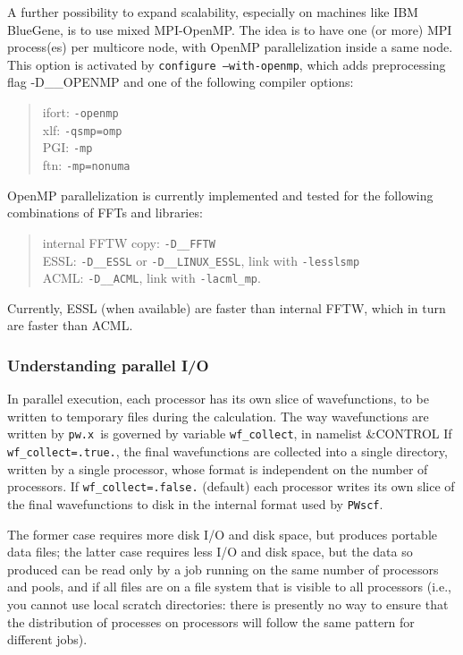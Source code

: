 \documentclass[12pt,a4paper]{article}
\def\pwx{\texttt{pw.x}}
\def\PWscf{\texttt{PWscf}}
\begin{document}
A further possibility to expand scalability, especially on machines
like IBM BlueGene, is to use mixed MPI-OpenMP. The idea is to have
one (or more) MPI process(es) per multicore node, with OpenMP
parallelization inside a same node. This option is activated by  \texttt{configure --with-openmp},
which adds preprocessing flag -D\_\_OPENMP
and one  of the following compiler options:
\begin{quote}
 ifort: \texttt{-openmp}\\
 xlf:   \texttt{-qsmp=omp}\\
 PGI:   \texttt{-mp}\\
 ftn:   \texttt{-mp=nonuma}
\end{quote}
OpenMP parallelization is currently implemented and tested for the following combinations of FFTs
and libraries:
\begin{quote}
 internal FFTW copy: \texttt{-D\_\_FFTW}\\
 ESSL: \texttt{-D\_\_ESSL} or \texttt{-D\_\_LINUX\_ESSL}, link 
 with \texttt{-lesslsmp}\\
 ACML: \texttt{-D\_\_ACML}, link with \texttt{-lacml\_mp}.
\end{quote}
Currently, ESSL (when available) are faster than internal FFTW,
which in turn are faster than ACML.

\subsubsection{Understanding parallel I/O}
In parallel execution, each processor has its own slice of wavefunctions, 
to be written to temporary files during the calculation. The way wavefunctions 
are written by \pwx\ is governed by variable \texttt{wf\_collect}, 
in namelist \&CONTROL 
If \texttt{wf\_collect=.true.}, the final wavefunctions are collected into a single 
directory, written by a single processor, whose format is independent on 
the number of processors. If \texttt{wf\_collect=.false.} (default) each processor
writes its own slice of the final 
wavefunctions to disk in the internal format used by \PWscf. 

The former case requires more
disk I/O and disk space, but produces portable data files; the latter case
requires less I/O and disk space, but the data so produced can be read only
by a job running on the same number of processors and pools, and if
all files are on a file system that is visible to all processors
(i.e., you cannot use local scratch directories: there is presently no
way to ensure that the distribution of processes on processors will
follow the same pattern for different jobs).
\end{document}
